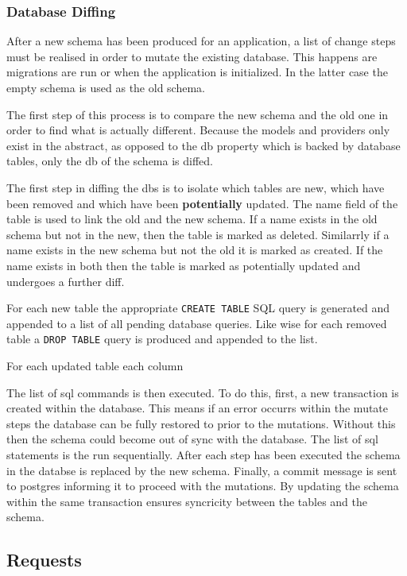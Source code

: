 \documentclass[
  12pt,
]{article}
\newcommand{\passthrough}[1]{#1}
\begin{document}
\hypertarget{database-diffing}{%
\subsubsection{Database Diffing}\label{database-diffing}}

After a new schema has been produced for an application, a list of
change steps must be realised in order to mutate the existing database.
This happens are migrations are run or when the application is
initialized. In the latter case the empty schema is used as the old
schema.

The first step of this process is to compare the new schema and the old
one in order to find what is actually different. Because the models and
providers only exist in the abstract, as opposed to the db property
which is backed by database tables, only the db of the schema is diffed.

The first step in diffing the dbs is to isolate which tables are new,
which have been removed and which have been \textbf{potentially}
updated. The name field of the table is used to link the old and the new
schema. If a name exists in the old schema but not in the new, then the
table is marked as deleted. Similarrly if a name exists in the new
schema but not the old it is marked as created. If the name exists in
both then the table is marked as potentially updated and undergoes a
further diff.

For each new table the appropriate
\passthrough{\lstinline!CREATE TABLE!} SQL query is generated and
appended to a list of all pending database queries. Like wise for each
removed table a \passthrough{\lstinline!DROP TABLE!} query is produced
and appended to the list.

For each updated table each column

The list of sql commands is then executed. To do this, first, a new
transaction is created within the database. This means if an error
occurrs within the mutate steps the database can be fully restored to
prior to the mutations. Without this then the schema could become out of
sync with the database. The list of sql statements is the run
sequentially. After each step has been executed the schema in the
databse is replaced by the new schema. Finally, a commit message is sent
to postgres informing it to proceed with the mutations. By updating the
schema within the same transaction ensures syncricity between the tables
and the schema.

\hypertarget{requests-1}{%
\subsection{Requests}\label{requests-1}}
\end{document}
